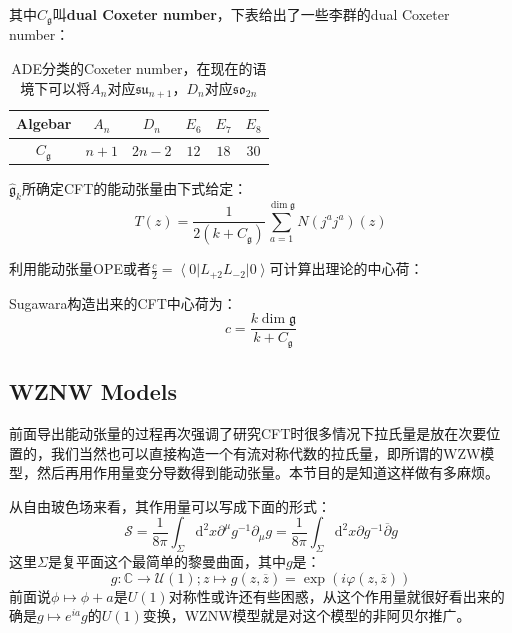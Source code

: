 其中$C_{\mathfrak{g}}$叫\textbf{dual Coxeter number}，下表给出了一些李群的dual Coxeter number：
\begin{table}[H]
	\centering
	\begin{tabular}{|c|c|c|c|c|c|}
		\hline
		Algebar        & $A_n$ & $D_n$  & $E_6$ & $E_7$ & $E_8$ \\ \hline
		$C_{\mathfrak{g}}$ & $n+1$ & $2n-2$ & $12$  & $18$  & $30$  \\ \hline
	\end{tabular}
	\caption{ADE分类的Coxeter number，在现在的语境下可以将$A_n$对应$\mathfrak{su}_{n+1}$，$D_n$对应$\mathfrak{so}_{2n}$}
\end{table}
\begin{theorem}
	$\hat{\mathfrak{g}}_k$所确定CFT的能动张量由下式给定：
	\begin{equation}\label{38.7}
		\boxed{
			T(z)=\frac1{2\left(k+C_{\mathfrak{g}}\right)}\sum_{a=1}^{\dim\mathfrak{g}}N\left(j^aj^a\right)(z)
		}
	\end{equation}
\end{theorem}
利用能动张量OPE或者$\frac c2=\left\langle0\right|L_{+2}L_{-2}\left|0\right\rangle $可计算出理论的中心荷：
\begin{theorem}
	Sugawara构造出来的CFT中心荷为：
	\begin{equation}
		\boxed{
			c=\frac{k\dim\mathfrak{g}}{k+C_{\mathfrak{g}}}
		}
	\end{equation}
\end{theorem}
\subsection{WZNW Models}
前面导出能动张量的过程再次强调了研究CFT时很多情况下拉氏量是放在次要位置的，我们当然也可以直接构造一个有流对称代数的拉氏量，即所谓的WZW模型，然后再用作用量变分导数得到能动张量。本节目的是知道这样做有多麻烦。

从自由玻色场来看，其作用量可以写成下面的形式：
\begin{equation}
	\mathcal{S}=\frac1{8\pi}\int_\Sigma\mathrm{d}^2x\partial^\mu g^{-1}\partial_\mu g=\frac1{8\pi}\int_\Sigma\mathrm{d}^2x\partial g^{-1}\overline{\partial}g
\end{equation}
这里$\Sigma$是复平面这个最简单的黎曼曲面，其中$g$是：
\begin{equation}
	g:\mathbb{C}\to\mathcal{U}(1);z\mapsto g(z,\overline{z})=\exp(i\varphi(z,\overline{z}))
\end{equation}
前面说$\phi\mapsto\phi+a$是$U(1)$对称性或许还有些困惑，从这个作用量就很好看出来的确是$g\mapsto e^{ia} g$的$U(1)$变换，WZNW模型就是对这个模型的非阿贝尔推广。
